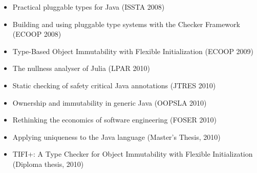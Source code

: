\begin{itemize}


\item
  Practical pluggable types for Java (ISSTA 2008)~\cite{PapiACPE2008}
\item
  Building and using pluggable type systems with the Checker Framework
  (ECOOP 2008)~\cite{Ernst2008}

\item
  Type-Based Object Immutability with Flexible Initialization (ECOOP
  2009)~\cite{HaackP2009}

\item
  The nullness analyser of Julia (LPAR 2010)~\cite{Spoto10:LPAR}
\item
  Static checking of safety critical Java annotations (JTRES 2010)~\cite{TangPJ2010}
\item
  Ownership and immutability in generic Java (OOPSLA 2010)~\cite{ZibinPLAE2010}
\item
  Rethinking the economics of software engineering (FOSER 2010)~\cite{SchillerE2010}
\item
  Applying uniqueness to the Java language (Master's Thesis, 2010)~\cite{Harper2010}
\item
  TIFI+: A Type Checker for Object Immutability with Flexible
  Initialization (Diploma thesis, 2010)~\cite{Noack2010}



\end{itemize}
